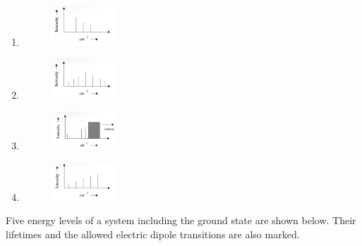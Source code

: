 \begin{enumerate}
\item \begin{figure}[!ht]
\includegraphics[width=2.5cm]{./GATE-yearwise/2009/figs/optionA.png}
\end{figure}
\item \begin{figure}[!ht]
\includegraphics[width=2.5cm]{./GATE-yearwise/2009/figs/optionB.png}
\end{figure}
\item \begin{figure}[!ht]
\includegraphics[width=2.5cm]{./GATE-yearwise/2009/figs/optionC.png}
\end{figure}
\item \begin{figure}[!ht]
\includegraphics[width=2.5cm]{./GATE-yearwise/2009/figs/optionD.png}
\end{figure}
\end{enumerate}
    \item Five energy levels of a system including the ground state are shown below. Their lifetimes and the allowed electric dipole transitions are also marked.\\
